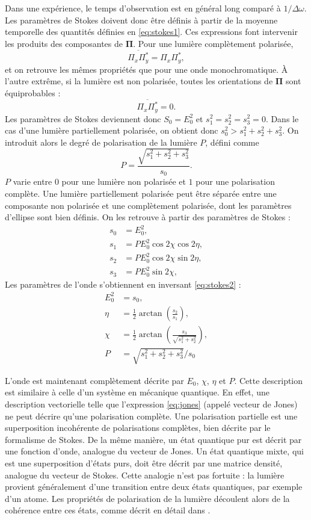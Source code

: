 Dans une expérience, le temps d'observation est en général long comparé à $1/\Delta\omega$. Les paramètres de Stokes doivent donc être définis à partir de la moyenne temporelle des quantités définies en \ref{eq:stokes1}. Ces expressions font intervenir les produits des composantes de $\bm{\Pi}$. Pour une lumière complètement polarisée,
\[\overline{\Pi_x \Pi^*_y} = \Pi_x \Pi^*_y,\]
et on retrouve les mêmes propriétés que pour une onde monochromatique. \`{A} l'autre extrême, si la lumière est non polarisée, toutes les orientations de $\bm{\Pi}$ sont équiprobables :
\[\overline{\Pi_x \Pi^*_y} = 0.\]
Les paramètres de Stokes deviennent donc $S_0 = E_0^2$ et $s_1^2 = s_2^2 = s_3^2 = 0$. Dans le cas d'une lumière partiellement polarisée, on obtient donc $s_0^2 > s_1^2+s_2^2+s_3^2$. On introduit alors le degré de polarisation de la lumière $P$, défini comme 
\[P = \frac{\sqrt{s_1^2+s_2^2+s_3^2}}{s_0}.\] $P$ varie entre $0$ pour une lumière non polarisée et $1$ pour une polarisation complète. Une lumière partiellement polarisée peut être séparée entre une composante non polarisée et une complètement polarisée, dont les paramètres d'ellipse sont bien définis. On les retrouve à partir des paramètres de Stokes :
\begin{align}
s_0 &= E_0^2,\nonumber\\
s_1 &= PE_0^2\cos 2\chi\cos 2\eta ,\nonumber\\
s_2 &= PE_0^2\cos 2\chi\sin 2\eta,\nonumber\\
s_3 &= PE_0^2\sin 2\chi,	
\label{eq:stokes2}
\end{align}
Les paramètres de l'onde s'obtiennent en inversant \ref{eq:stokes2} :
\begin{align}
E_0^2 &= s_0,\nonumber\\
\eta &= \frac{1}{2} \arctan\left(\frac{s_2}{s_1}\right),\nonumber\\
\chi &= \frac{1}{2} \arctan\left(\frac{s_3}{\sqrt{s_1^2+s_2^2}}\right),\nonumber\\
P &= \sqrt{s_1^2+s_2^2+s_3^2}/s_0
\label{eq:stokes2inv}
\end{align}

L'onde est maintenant complètement décrite par $E_0$, $\chi$, $\eta$ et $P$. Cette description est similaire à celle d'un système en mécanique quantique. En effet, une description vectorielle telle que l'expression \ref{eq:jones} (appelé vecteur de Jones) ne peut décrire qu'une polarisation complète. Une polarisation partielle est une superposition incohérente de polarisations complètes, bien décrite par le formalisme de Stokes. De la même manière, un état quantique pur est décrit par une fonction d'onde, analogue du vecteur de Jones. Un état quantique mixte, qui est une superposition d'états purs, doit être décrit par une matrice densité, analogue du vecteur de Stokes. Cette analogie n'est pas fortuite : la lumière provient généralement d'une transition entre deux états quantiques, par exemple d'un atome. Les propriétés de polarisation de la lumière découlent alors de la cohérence entre ces états, comme décrit en détail dans . 

